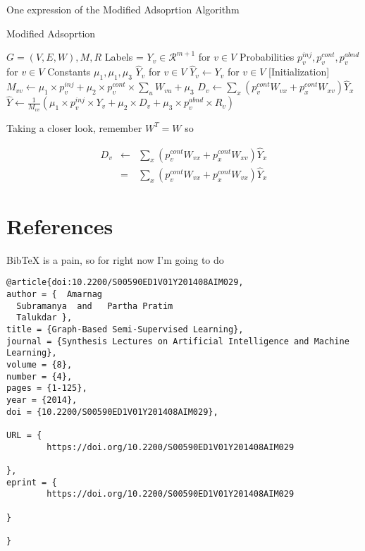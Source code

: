\documentclass{article}
\begin{document}
\begin{algorithm}
\caption{One expression of the Modified Adsoprtion Algorithm}
\begin{algorithmic}[1]
\caption{Modified Adsoprtion}\label{euclid}
	  \State $G = (V,E,W), M, R$
	  \State Labels = $Y_v \in \mathcal{R}^{m+1}$ for $v \in V$
	  \State Probabilities $p_v^{inj}, p_v^{cont}, p_v^{abnd}$ for $v \in V$
	  \State Constants $\mu_1, \mu_1, \mu_3$
	\EndProcedure
	  \State $\hat Y_v$ for $v \in V$
	\EndProcedure
	  \State $\hat Y_v \gets Y_v$ for $v \in V$ [Initialization]
	  \State $M_{vv} \gets \mu_1 \times p_v^{inj} + \mu_2 \times p_v^{cont} \times \sum_u W_{vu} + \mu_3$
	  \State $D_v \gets \sum_x \left(p_v^{cont} W_{vx} + p_x^{cont} W_{xv}\right) \hat Y_x $
	    \State $\hat Y \gets \frac{1}{M_{vv}} \left(\mu_1 \times p_v^{inj} \times Y_v + \mu_2 \times D_v + \mu_3 \times p_v^{abnd} \times R_v \right) $ 
	  \EndFor
	\EndWhile
	\EndProcedure
\end{algorithmic}
\end{algorithm}

Taking a closer look, remember $W^T=W$ so

\begin{eqnarray}
D_v &\gets& \sum_x \left(p_v^{cont} W_{vx} + p_x^{cont} W_{xv}\right) \hat Y_x \\
 &=& \sum_x \left(p_v^{cont} W_{vx} + p_x^{cont} W_{vx}\right) \hat Y_x
\end{eqnarray}

\section{References}
BibTeX is a pain, so for right now I'm going to do

\begin{verbatim}
@article{doi:10.2200/S00590ED1V01Y201408AIM029,
author = {  Amarnag 
  Subramanya  and   Partha Pratim 
  Talukdar },
title = {Graph-Based Semi-Supervised Learning},
journal = {Synthesis Lectures on Artificial Intelligence and Machine Learning},
volume = {8},
number = {4},
pages = {1-125},
year = {2014},
doi = {10.2200/S00590ED1V01Y201408AIM029},

URL = { 
        https://doi.org/10.2200/S00590ED1V01Y201408AIM029
    
},
eprint = { 
        https://doi.org/10.2200/S00590ED1V01Y201408AIM029
    
}

}
\end{verbatim}
\end{document}

